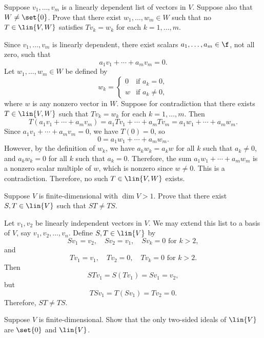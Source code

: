 \begin{exercise}[3a15]
    Suppose $v_1, \ldots, v_m$ is a linearly dependent list of vectors in $V$. Suppose also that $W \neq \set{0}$. Prove that there exist $w_1, \ldots, w_m \in W$ such that no $T \in \lin{V, W}$ satisfies $Tv_k = w_k$ for each $k = 1, \ldots, m$.
\end{exercise}

\begin{sol}
    Since $v_1, \ldots, v_m$ is linearly dependent, there exist scalars $a_1, \ldots, a_m \in \f$, not all zero, such that
    \[a_1 v_1 + \cdots + a_m v_m = 0.\]
    Let $w_1, \ldots, w_m \in W$ be defined by
    \[w_k =
    \begin{cases}
        0 & \text{if } a_k = 0, \\
        w & \text{if } a_k \neq 0,
    \end{cases}\]
    where $w$ is any nonzero vector in $W$. Suppose for contradiction that there exists $T \in \lin{V, W}$ such that $Tv_k = w_k$ for each $k = 1, \ldots, m$. Then
    \[T(a_1 v_1 + \cdots + a_m v_m) = a_1 Tv_1 + \cdots + a_m Tv_m = a_1 w_1 + \cdots + a_m w_m.\]
    Since $a_1 v_1 + \cdots + a_m v_m = 0$, we have $T(0) = 0$, so
    \[0 = a_1 w_1 + \cdots + a_m w_m.\]
    However, by the definition of $w_k$, we have $a_k w_k = a_k w$ for all $k$ such that $a_k \neq 0$, and $a_k w_k = 0$ for all $k$ such that $a_k = 0$. Therefore, the sum $a_1 w_1 + \cdots + a_m w_m$ is a nonzero scalar multiple of $w$, which is nonzero since $w \neq 0$. This is a contradiction. Therefore, no such $T \in \lin{V, W}$ exists.
\end{sol}

\begin{exercise}[3a16]
    Suppose $V$ is finite-dimensional with $\dim V > 1$. Prove that there exist $S, T \in \lin{V}$ such that $ST \neq TS$.
\end{exercise}

\begin{sol}
    Let $v_1, v_2$ be linearly independent vectors in $V$. We may extend this list to a basis of $V$, say $v_1, v_2, \ldots, v_n$. Define $S, T \in \lin{V}$ by
    \[Sv_1 = v_2, \quad Sv_2 = v_1, \quad Sv_k = 0 \text{ for } k > 2,\]
    and
    \[Tv_1 = v_1, \quad Tv_2 = 0, \quad Tv_k = 0 \text{ for } k > 2.\]
    Then
    \[STv_1 = S(Tv_1) = Sv_1 = v_2,\]
    but
    \[TSv_1 = T(Sv_1) = Tv_2 = 0.\]
    Therefore, $ST \neq TS$.
\end{sol}

\begin{exercise}[3a17]
    Suppose $V$ is finite-dimensional. Show that the only two-sided ideals of $\lin{V}$ are $\set{0}$ and $\lin{V}$.
    
\end{exercise}

